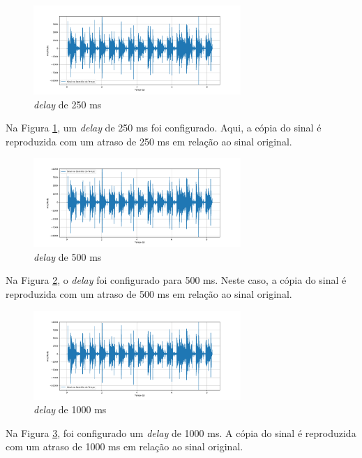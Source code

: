 \begin{figure}[h]
	\centering
    \includegraphics[width=0.7\textwidth]{figuras/fig75.png}
	\caption{\textit{delay} de 250 ms}
	\label{fig75}
\end{figure}

Na Figura \ref{fig75}, um \textit{delay} de 250 ms foi configurado. Aqui, a cópia do sinal é reproduzida com um atraso de 250 ms em relação ao sinal original.

\begin{figure}[h]
	\centering
    \includegraphics[width=0.7\textwidth]{figuras/fig76.png}
	\caption{\textit{delay} de 500 ms}
	\label{fig76}
\end{figure}

Na Figura \ref{fig76}, o \textit{delay} foi configurado para 500 ms. Neste caso, a cópia do sinal é reproduzida com um atraso de 500 ms em relação ao sinal original.

\newpage
\begin{figure}[h]
	\centering
    \includegraphics[width=0.7\textwidth]{figuras/fig77.png}
	\caption{\textit{delay} de 1000 ms}
	\label{fig77}
\end{figure}

Na Figura \ref{fig77}, foi configurado um \textit{delay} de 1000 ms. A cópia do sinal é reproduzida com um atraso de 1000 ms em relação ao sinal original.


